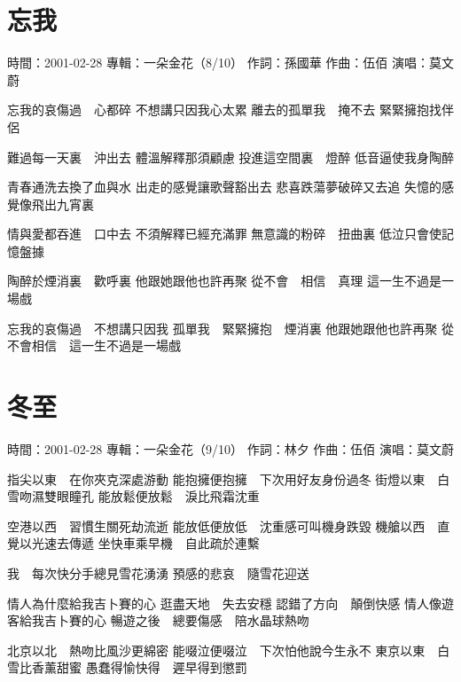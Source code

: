 \documentclass[UTF8,a4paper,oneside,twocolumn,12pt]{ctexbook}
\newcommand{\infopair}[2]{\textbullet #1：#2}
\newcommand{\zc}[1][伍佰]{\infopair{作詞}{#1}}
\newcommand{\zq}[1][伍佰]{\infopair{作曲}{#1}}
\newcommand{\zj}[1]{\infopair{專輯}{#1}}
\newcommand{\sj}[1]{\infopair{時間}{#1}}
\newenvironment{info}{\begin{flushleft}\kaishu
	}
	{\end{flushleft}\normalsize\yahei\par}
\newenvironment{lyric}{
	}
{}
\begin{document}
\section{忘我}
\begin{info}
	\sj{2001-02-28}
	\zj{一朵金花（8/10）}
	\zc[孫國華]
	\zq
	\infopair{演唱}{莫文蔚}
\end{info}
\begin{lyric}
	忘我的哀傷過　心都碎
	不想講只因我心太累
	離去的孤單我　掩不去
	緊緊擁抱找伴侶

	難過每一天裏　沖出去
	體溫解釋那須顧慮
	投進這空間裏　燈醉
	低音逼使我身陶醉

	青春通洗去換了血與水
	出走的感覺讓歌聲豁出去
	悲喜跌蕩夢破碎又去追
	失憶的感覺像飛出九宵裏

	情與愛都吞進　口中去
	不須解釋已經充滿罪
	無意識的粉碎　扭曲裏
	低泣只會使記憶盤據

	陶醉於煙消裏　歡呼裏
	他跟她跟他也許再聚
	從不會　相信　真理
	這一生不過是一場戲

	忘我的哀傷過　不想講只因我
	孤單我　緊緊擁抱　煙消裏
	他跟她跟他也許再聚
	從不會相信　這一生不過是一場戲
\end{lyric}

\section{冬至}
\begin{info}
	\sj{2001-02-28}
	\zj{一朵金花（9/10）}
	\zc[林夕]
	\zq
	\infopair{演唱}{莫文蔚}
\end{info}
\begin{lyric}
	指尖以東　在你夾克深處游動
	能抱擁便抱擁　下次用好友身份過冬
	街燈以東　白雪吻濕雙眼瞳孔
	能放鬆便放鬆　淚比飛霜沈重

	空港以西　習慣生關死劫流逝
	能放低便放低　沈重感可叫機身跌毀
	機艙以西　直覺以光速去傳遞
	坐快車乘早機　自此疏於連繫

	我　每次快分手總見雪花湧湧
	預感的悲哀　隨雪花迎送

	情人為什麼給我吉卜賽的心
	逛盡天地　失去安穩
	認錯了方向　顛倒快感
	情人像遊客給我吉卜賽的心
	暢遊之後　總要傷感　陪水晶球熱吻

	北京以北　熱吻比風沙更綿密
	能啜泣便啜泣　下次怕他說今生永不
	東京以東　白雪比香薰甜蜜
	愚蠢得愉快得　遲早得到懲罰
\end{lyric}
\end{document}
